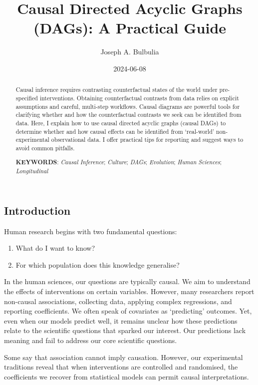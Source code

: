 \documentclass[
  single column]{article}
\title{Causal Directed Acyclic Graphs (DAGs): A Practical Guide}
\author{Joseph A. Bulbulia}
\affil{%
             \small{     Victoria University of Wellington, New Zealand
          ORCID \textcolor[HTML]{A6CE39}{\aiOrcid} ~0000-0002-5861-2056 }
              }
\date{2024-06-08}
\providecommand{\tightlist}{%
  \setlength{\itemsep}{0pt}\setlength{\parskip}{0pt}}\usepackage{longtable,booktabs,array}
\begin{document}
\maketitle
\begin{abstract}
Causal inference requires contrasting counterfactual states of the world
under pre-specified interventions. Obtaining counterfactual contrasts
from data relies on explicit assumptions and careful, multi-step
workflows. Causal diagrams are powerful tools for clarifying whether and
how the counterfactual contrasts we seek can be identified from data.
Here, I explain how to use causal directed acyclic graphs (causal DAGs)
to determine whether and how causal effects can be identified from
`real-world' non-experimental observational data. I offer practical tips
for reporting and suggest ways to avoid common pitfalls.

\textbf{KEYWORDS}: \emph{Causal Inference}; \emph{Culture}; \emph{DAGs};
\emph{Evolution}; \emph{Human Sciences}; \emph{Longitudinal}
\end{abstract}

\subsection{Introduction}\label{id-sec-introduction}

Human research begins with two fundamental questions:

\begin{enumerate}
\def\labelenumi{\arabic{enumi}.}
\tightlist
\item
  What do I want to know?
\item
  For which population does this knowledge generalise?
\end{enumerate}

In the human sciences, our questions are typically causal. We aim to
understand the effects of interventions on certain variables. However,
many researchers report non-causal associations, collecting data,
applying complex regressions, and reporting coefficients. We often speak
of covariates as `predicting' outcomes. Yet, even when our models
predict well, it remains unclear how these predictions relate to the
scientific questions that sparked our interest. Our predictions lack
meaning and fail to address our core scientific questions.

Some say that association cannot imply causation. However, our
experimental traditions reveal that when interventions are controlled
and randomised, the coefficients we recover from statistical models can
permit causal interpretations.
\end{document}
